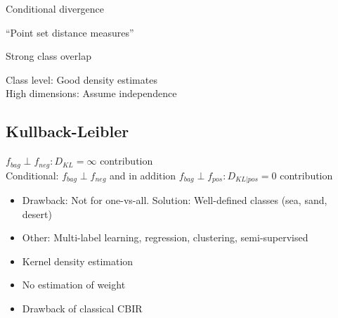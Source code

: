 Conditional divergence


``Point set distance measures''

Strong class overlap


Class level: Good density estimates\\
High dimensions: Assume independence

\subsection{Kullback-Leibler} 

$f_{bag} \perp f_{neg} : D_{KL} = \infty$ contribution \\
Conditional: $f_{bag} \perp f_{neg}$ and in addition $f_{bag} \perp f_{pos} : D_{KL|pos} = 0$ contribution

\begin{itemize}
  \item Drawback: Not for one-vs-all. Solution: Well-defined classes (sea, sand, desert)
  \item Other: Multi-label learning, regression, clustering, semi-supervised
  \item Kernel density estimation
  \item No estimation of weight
  \item Drawback of classical CBIR
\end{itemize}